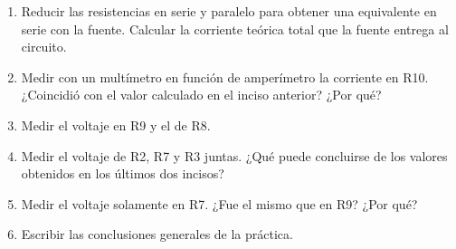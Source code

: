 \documentclass[letterpaper, 12 pt, conference]{ieeeconf}  %
\begin{document}
\begin{enumerate}
    \item Reducir las resistencias en serie y paralelo para obtener una equivalente en serie con la fuente. Calcular la corriente teórica total que la fuente entrega al circuito.
    \item Medir con un multímetro en función de amperímetro la corriente en R10. ¿Coincidió con el valor calculado en el inciso anterior? ¿Por qué?
    \item Medir el voltaje en R9 y el de R8. 
    \item Medir el voltaje de R2, R7 y R3 juntas. ¿Qué puede concluirse de los valores obtenidos en los últimos dos incisos?
    \item Medir el voltaje solamente en R7. ¿Fue el mismo que en R9? ¿Por qué?
    \item Escribir las conclusiones generales de la práctica.
\end{enumerate}
\addtolength{\textheight}{-12cm}   %
\end{document}
